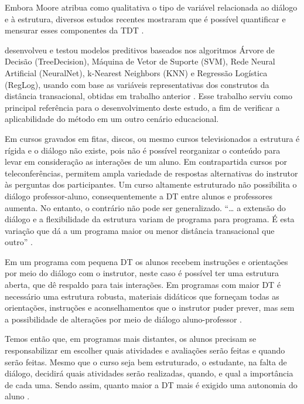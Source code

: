 Embora Moore atribua como qualitativa o tipo de variável relacionada ao diálogo
e à estrutura, diversos estudos recentes mostraram que é possível quantificar e
mensurar esses componentes da TDT
\cite{zhang2003transactional,horzum2011developing,paul2015revisiting,
ramos2016abordagem}.

 desenvolveu e testou modelos preditivos baseados
nos algoritmos Árvore de Decisão (TreeDecision), Máquina de Vetor de Suporte
(SVM), Rede Neural Artificial (NeuralNet), k-Nearest Neighbors (KNN) e Regressão
Logística (RegLog), usando com base as variáveis representativas dos construtos
da distância transacional, obtidas em trabalho anterior
\cite{ramos2016mapeamento}. Esse trabalho serviu como principal referência para
o desenvolvimento deste estudo, a fim de verificar a aplicabilidade do método em
um outro cenário educacional.

Em cursos gravados em fitas, discos, ou mesmo cursos televisionados a estrutura
é rígida e o diálogo não existe, pois não é possível reorganizar o conteúdo para
levar em consideração as interações de um aluno. Em contrapartida cursos por
teleconferências, permitem ampla variedade de respostas alternativas do
instrutor às perguntas dos participantes. Um curso altamente estruturado não
possibilita o diálogo professor-aluno, consequentemente a DT entre alunos e
professores aumenta. No entanto, o contrário não pode ser generalizado. ``\ldots
a extensão do diálogo e a flexibilidade da estrutura variam de programa para
programa. É esta variação que dá a um programa maior ou menor distância
transacional que outro'' \cite{moore2008teoria}.

Em um programa com pequena DT os alunos recebem instruções e orientações por
meio do diálogo com o instrutor, neste caso é possível ter uma estrutura aberta,
que dê respaldo para tais interações. Em programas com maior DT é necessário uma
estrutura robusta, materiais didáticos que forneçam todas as orientações,
instruções e aconselhamentos que o instrutor puder prever, mas sem a
possibilidade de alterações por meio de diálogo aluno-professor
\cite{moore2008teoria}.

Temos então que, em programas mais distantes, os alunos precisam se
responsabilizar em escolher quais atividades e avaliações serão feitas e quando
serão feitas. Mesmo que o curso seja bem estruturado, o estudante, na falta de
diálogo, decidirá quais atividades serão realizadas, quando, e qual a
importância de cada uma. Sendo assim, quanto maior a DT mais é exigido uma
autonomia do aluno \cite{moore2008teoria}.


